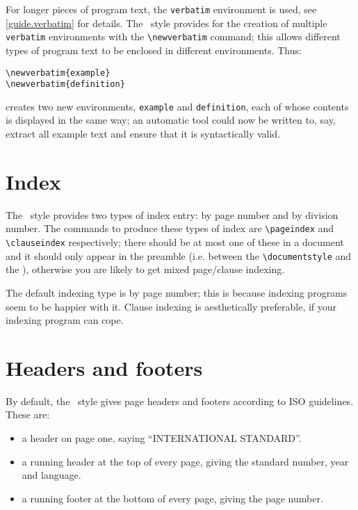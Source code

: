 \label{newverb}
For longer pieces of program text, the \verb|verbatim| environment
is used, see \ref{guide.verbatim} for details.
The \iso\ style provides for the creation of multiple \verb|verbatim|
environments with the \verb|\newverbatim| command; this allows different
types of program text to be enclosed in different environments.
Thus:
\begin{verbatim}
\newverbatim{example}
\newverbatim{definition}
\end{verbatim}
creates two new environments, \verb|example| and \verb|definition|,
each of whose contents is displayed in the same way; an automatic
tool could now be written to, say, extract all example text and ensure
that it is syntactically valid.

\section{Index}
The \iso\ style provides two types of index entry: by page number and
by division number.
The commands to produce these types of index are \verb|\pageindex| and
\verb|\clauseindex| respectively; there should be at most one of these in
a document and it should only appear in the preamble (i.e. between the
\verb|\documentstyle| and the \verb||), otherwise you are
likely to get mixed page/clause indexing.

The default indexing type is by page number; this is because indexing
programs seem to be happier with it.
Clause indexing is aesthetically preferable, if your indexing program
can cope.

\section{Headers and footers}
By default, the \iso\ style gives page headers and footers according
to ISO guidelines.
These are:
\begin{itemize}
\item a header on page one, saying ``INTERNATIONAL STANDARD''.
\item a running header at the top of every page, giving
    the standard number, year and language.
\item a running footer at the bottom of every page, giving the page
    number.
\end{itemize}

